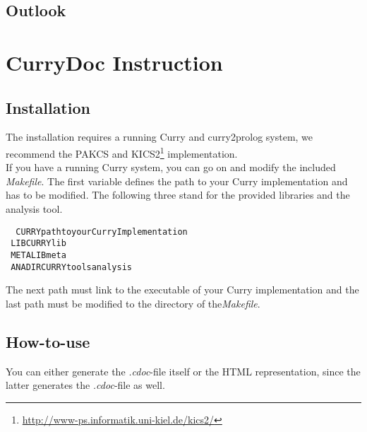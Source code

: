 \documentclass[%
	pdftex,%
	a4paper,%
	oneside,%
	chapterprefix,%
	headsepline,%
	12pt%
]{scrbook}
\begin{document}
\section{Outlook}

\newpage
{}
\setcounter{page}{\value{roemisch}}

\appendix
\chapter{CurryDoc Instruction}\label{a:currydoc}
\section{Installation}

The installation requires a running Curry and curry2prolog system, we
recommend the PAKCS and
KICS2\footnote{\url{http://www-ps.informatik.uni-kiel.de/kics2/}}
implementation. \\

If you have a running Curry system, you can go on and modify the
included \emph{Makefile}. %
The first variable defines the path to your Curry implementation and
has to be modified. %
The following three stand for the provided libraries and the analysis
tool. %

\begin{tabbing}\tt
~CURRYpathtoyourCurryImplementation\\
\tt ~LIBCURRYlib\\
\tt ~METALIBmeta\\
\tt ~ANADIRCURRYtoolsanalysis
\end{tabbing}

The next path must link to the executable of your Curry implementation
and the last path must be modified to the directory of
the\emph{Makefile}.

\section{How-to-use}

You can either generate the \emph{.cdoc}-file itself or the HTML
representation, since the latter generates the \emph{.cdoc}-file as well.
 
\end{document}
